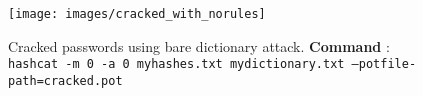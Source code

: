 \documentclass[11pt,letterpaper]{article}
\newenvironment{answer}{\em \color{blue} \begin{adjustwidth}{1cm}{1cm}}{\end{adjustwidth}}
\begin{document}
\begin{enumerate}
\begin{answer}
			\begin{figure}[h]
				\centering
				\texttt{[image: images/cracked\_with\_norules]}
				\caption{Cracked passwords using bare dictionary attack. \textbf{Command} : {\tt hashcat -m 0 -a 0 myhashes.txt mydictionary.txt --potfile-path=cracked.pot}} \label{fig:cracked_with_norules}
			\end{figure}
		\end{answer}
		
	\end{enumerate}
	
\end{document}
